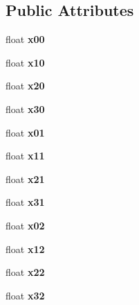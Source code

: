 \subsection*{Public Attributes}
\begin{DoxyCompactItemize}
\item 
\hypertarget{classMatrix_ae83b796149e7692ce40c1cbdf4dd6f09}{float {\bfseries x00}}\label{classMatrix_ae83b796149e7692ce40c1cbdf4dd6f09}

\item 
\hypertarget{classMatrix_a27444a60f9571b225f6b5ce12a5eca11}{float {\bfseries x10}}\label{classMatrix_a27444a60f9571b225f6b5ce12a5eca11}

\item 
\hypertarget{classMatrix_aeed1c8585b1117930be0ff04bb59b841}{float {\bfseries x20}}\label{classMatrix_aeed1c8585b1117930be0ff04bb59b841}

\item 
\hypertarget{classMatrix_aa7fd1be4eb967ca4a2dca1629913b320}{float {\bfseries x30}}\label{classMatrix_aa7fd1be4eb967ca4a2dca1629913b320}

\item 
\hypertarget{classMatrix_a0d61e61547844a875cbe7bbc9ac45655}{float {\bfseries x01}}\label{classMatrix_a0d61e61547844a875cbe7bbc9ac45655}

\item 
\hypertarget{classMatrix_a8ab47a8d3f04f391429640eee452f7a6}{float {\bfseries x11}}\label{classMatrix_a8ab47a8d3f04f391429640eee452f7a6}

\item 
\hypertarget{classMatrix_acee3423cbef48d33c2411d90c882a371}{float {\bfseries x21}}\label{classMatrix_acee3423cbef48d33c2411d90c882a371}

\item 
\hypertarget{classMatrix_a6f6dbdec61807b9ec97b5c43072d9a74}{float {\bfseries x31}}\label{classMatrix_a6f6dbdec61807b9ec97b5c43072d9a74}

\item 
\hypertarget{classMatrix_aececca699c796ad7b1dd2e52820218c3}{float {\bfseries x02}}\label{classMatrix_aececca699c796ad7b1dd2e52820218c3}

\item 
\hypertarget{classMatrix_a9d02b516fb5aace9e21be7ead5494b87}{float {\bfseries x12}}\label{classMatrix_a9d02b516fb5aace9e21be7ead5494b87}

\item 
\hypertarget{classMatrix_a86643f9e4ba0701c4c220ec6292fe426}{float {\bfseries x22}}\label{classMatrix_a86643f9e4ba0701c4c220ec6292fe426}

\item 
\hypertarget{classMatrix_a1b08b0cdc3390fcec6e9dc71d5156bac}{float {\bfseries x32}}\label{classMatrix_a1b08b0cdc3390fcec6e9dc71d5156bac}

\end{DoxyCompactItemize}
